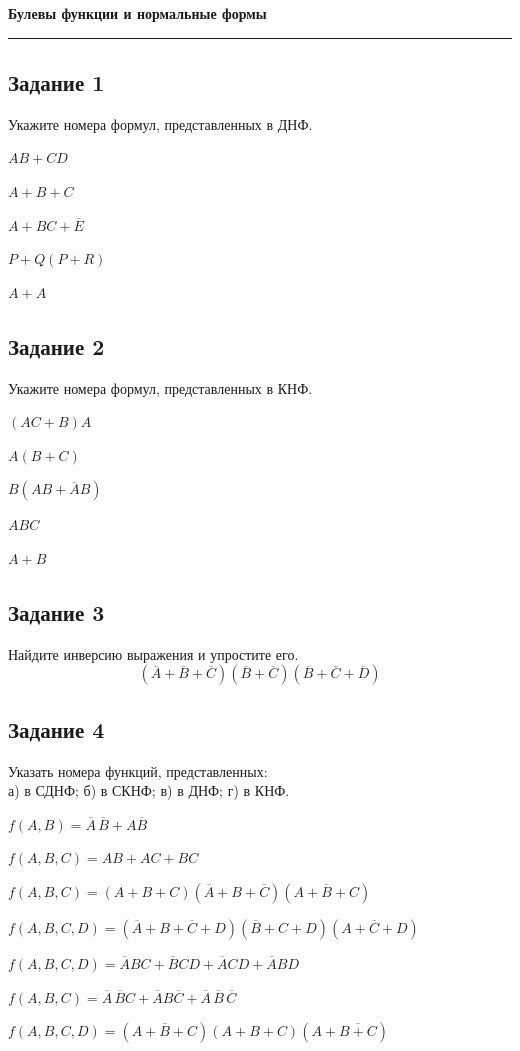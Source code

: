 \documentclass[a4paper,12pt,oneside]{article}
\newcommand{\Task}[1]{%
  \subsection*{#1}%
  \vspace{-0.2\baselineskip}%
}
\begin{document}
\begin{center}
    {\Large\bfseries Булевы функции и нормальные формы}\\[2mm]
\end{center}
\vspace{2mm}
\hrule
\vspace{4mm}

\Task{Задание 1}
Укажите номера формул, представленных в ДНФ.
\begin{numlist}
    \item $AB+CD$
    \item $A+B+C$
    \item $A+BC+\overline{E}$
    \item $P+Q(P+R)$
    \item $A+A$
\end{numlist}

\Task{Задание 2}
Укажите номера формул, представленных в КНФ.
\begin{numlist}
    \item $(AC+B)A$
    \item $A(B+C)$
    \item $B(AB+\overline{A}B)$
    \item $ABC$
    \item $A+B$
\end{numlist}

\Task{Задание 3}
Найдите инверсию выражения и упростите его.
\[
(\overline{A}+\overline{B}+\overline{C})(\overline{B}+\overline{C})(\overline{B}+\overline{C}+\overline{D})
\]

\Task{Задание 4}
Указать номера функций, представленных:\\ а) в СДНФ; б) в СКНФ; в) в ДНФ; г) в КНФ.
\begin{numlist}
    \item $f(A,B)=\overline{A}\,\overline{B}+A\overline{B}$
    \item $f(A,B,C)=AB+AC+BC$
    \item $f(A,B,C)=(A+B+C)(\overline{A}+B+\overline{C})(A+\overline{B}+C)$
    \item $f(A,B,C,D)=(\overline{A}+B+\overline{C}+D)(\overline{B}+C+D)(A+\overline{C}+D)$
    \item $f(A,B,C,D)=\overline{A}BC+\overline{B}CD+\overline{A}CD+\overline{A}BD$
    \item $f(A,B,C)=\overline{A}\,\overline{B}C+\overline{A}B\overline{C}+\overline{A}\,\overline{B}\,\overline{C}$
    \item $f(A,B,C,D)=(A+\overline{B}+C)(A+B+C)(A+\overline{B+C})$
\end{numlist}
\end{document}
